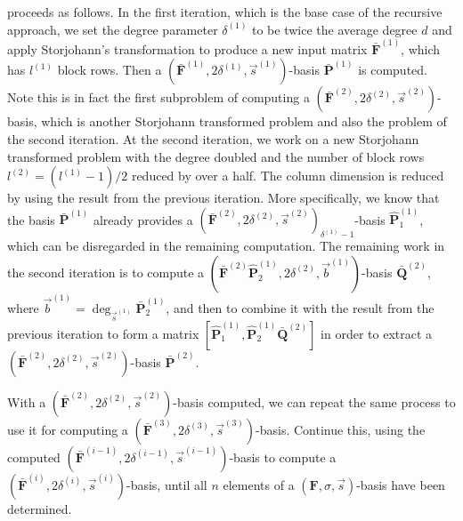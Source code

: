  proceeds as follows. In the first iteration,
which is the base case of the recursive approach, we set the degree
parameter $\delta^{\left(1\right)}$ to be twice the average degree
$d$ and apply Storjohann's transformation to produce a new input
matrix $\bar{\mathbf{F}}^{\left(1\right)}$, which has $l^{\left(1\right)}$
block rows. Then a $(\bar{\mathbf{F}}^{\left(1\right)},2\delta^{\left(1\right)},\vec{s}^{\left(1\right)})$-basis
$\bar{\mathbf{P}}^{\left(1\right)}$ is computed. Note this is in
fact the first subproblem of computing a $(\bar{\mathbf{F}}^{\left(2\right)},2\delta^{\left(2\right)},\vec{s}^{\left(2\right)})$-basis,
which is another Storjohann transformed problem and also the problem
of the second iteration. At the second iteration, we work on a new
Storjohann transformed problem with the degree doubled and the number
of block rows $l^{\left(2\right)}=(l^{\left(1\right)}-1)/2$ reduced
by over a half. The column dimension is reduced by using the result
from the previous iteration. More specifically, we know that the basis
$\bar{\mathbf{P}}^{\left(1\right)}$ already provides a $(\bar{\mathbf{F}}^{\left(2\right)},2\delta^{\left(2\right)},\vec{s}^{\left(2\right)})_{\delta^{\left(1\right)}-1}$-basis
$\hat{\mathbf{P}}_{1}^{\left(1\right)}$, which can be disregarded
in the remaining computation. The remaining work in the second iteration
is to compute a $(\bar{\mathbf{F}}^{\left(2\right)}\hat{\mathbf{P}}_{2}^{\left(1\right)},2\delta^{\left(2\right)},\vec{b}^{\left(1\right)})$-basis
$\bar{\mathbf{Q}}^{\left(2\right)}$, where $\vec{b}^{\left(1\right)}=\deg_{\vec{s}^{\left(1\right)}}\bar{\mathbf{P}}_{2}^{\left(1\right)}$,
and then to combine it with the result from the previous iteration
to form a matrix $[\hat{\mathbf{P}}_{1}^{\left(1\right)},\hat{\mathbf{P}}_{2}^{\left(1\right)}\bar{\mathbf{Q}}^{\left(2\right)}]$
in order to extract a $(\bar{\mathbf{F}}^{\left(2\right)},2\delta^{\left(2\right)},\vec{s}^{\left(2\right)})$-basis
$\bar{\mathbf{P}}^{\left(2\right)}$.

With a $(\bar{\mathbf{F}}^{\left(2\right)},2\delta^{\left(2\right)},\vec{s}^{\left(2\right)})$-basis
computed, we can repeat the same process to use it for computing a
$(\bar{\mathbf{F}}^{\left(3\right)},2\delta^{\left(3\right)},\vec{s}^{\left(3\right)})$-basis.
Continue this, using the computed $(\bar{\mathbf{F}}^{\left(i-1\right)},2\delta^{\left(i-1\right)},\vec{s}^{\left(i-1\right)})$-basis
to compute a $(\bar{\mathbf{F}}^{\left(i\right)},2\delta^{\left(i\right)},\vec{s}^{\left(i\right)})$-basis,
until all $n$ elements of a $\left(\mathbf{F},\sigma,\vec{s}\right)$-basis
have been determined.



\begin{comment}
\begin{thm}
Algorithm \prettyref{alg:mab} computes a $\left(\mathbf{F},\sigma,\vec{s}\right)$-basis
correctly.\end{thm}
\begin{proof}
This follows from \prettyref{lem:simplifySecondSubproblem}, \prettyref{lem:disregardComputedBasisElements},
and \prettyref{lem:computationAtTopLevel}. \end{proof}
\end{comment}
{} 
